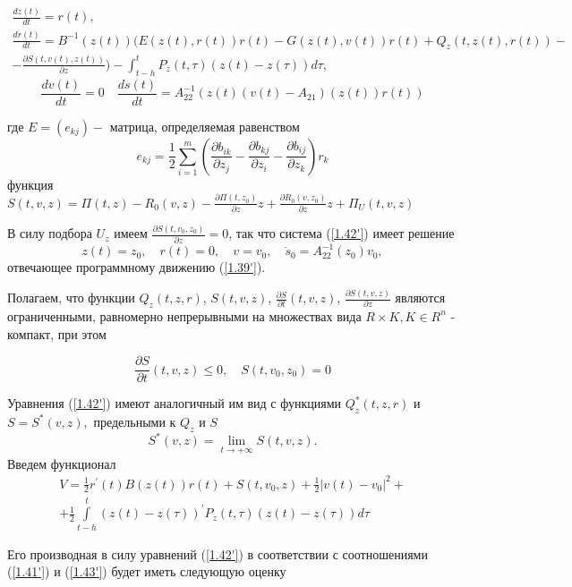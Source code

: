 \begin{equation} \label{1.42'}
\begin{array}{c}
\displaystyle \frac{d z (t)}{dt} = r(t),\\
\displaystyle \frac{d r(t)}{dt} = B^{-1} (z(t)) (E(z(t), r(t)) r(t) - G(z(t), v(t)) r(t) + Q_z (t, z(t), r(t)) -\\
\displaystyle - \frac{\partial S(t, v(t), z(t))}{\partial z}) - \int_{t - h}^{t} P_z (t, \tau) (z(t) - z(\tau)) d \tau,
\end{array}
\end{equation}
$$\frac{d v(t)}{dt} = 0 \quad \frac{d s(t)}{dt} = A_{22}^{-1} (z(t) (v(t) - A_{21}) (z(t)) r(t))$$

где $E = (e_{kj}) - $ матрица, определяемая равенством 
$$e_{kj} = \frac12 \sum_{ i = 1}^{m} (\frac{\partial b_{ik}}{\partial z_j} - \frac{\partial b_{kj}}{\partial z_i} - \frac{\partial b_{ij}}{\partial z_k}) r_k$$
функция $S(t, v, z) = \Pi (t, z) - R_0 (v, z) - \frac{\partial \Pi (t, z_0)}{\partial z} z + \frac{\partial R_0 (v, z_0)}{\partial z} z + \Pi_U (t, v, z)$

В силу подбора $U_z$ имеем $\frac{\partial S(t, v_0, z_0)}{\partial z} = 0$, так что система (\ref{1.42'}) имеет решение 
$$z(t) = z_0, \quad r(t) = 0, \quad v = v_0, \quad \dot s_0 = A_{22}^{-1} (z_0) v_0,$$ 
отвечающее программному движению (\ref{1.39'}).

Полагаем, что функции $Q_z (t, z, r)$, $S(t, v, z)$, $\frac{\partial S}{\partial t} (t, v, z)$, $\frac{\partial S(t, v, z)}{\partial z}$ являются ограниченными, равномерно непрерывными на множествах вида $R \times K, K \in R^n$ - компакт, при этом

\begin{equation} \label{1.43'}
\frac{\partial S}{\partial t} (t, v, z) \le 0, \quad S(t, v_0, z_0) = 0
\end{equation}

Уравнения (\ref{1.42'}) имеют аналогичный им вид с функциями $Q_z^{*} (t, z, r)$ и $S = S^{*} (v, z),$ предельными к $Q_z$ и $S$
$$S^{*} (v, z) = \lim_{t \to + \infty} S(t, v, z).$$
Введем функционал
$$
\begin{array}{c}
\displaystyle V = \frac12 r^{'}(t) B (z(t)) r(t) + S(t, v_0, z) + \frac12 \left| v(t) - v_0 \right|^2 +\\
\displaystyle + \frac12 \int\limits_{t - h}^{t} (z(t) - z(\tau))^{'} P_z (t, \tau) (z(t) - z(\tau)) d \tau
\end{array}
$$

Его производная в силу уравнений (\ref{1.42'}) в соответствии с соотношениями (\ref{1.41'}) и (\ref{1.43'}) будет иметь следующую оценку

